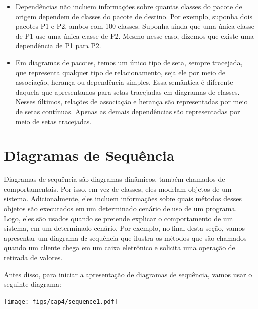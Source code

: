 \documentclass[
  11pt,
  twoside]{book}
\begin{document}
\begin{itemize}
\item
  Dependências não incluem informações sobre quantas classes do pacote
  de origem dependem de classes do pacote de destino. Por exemplo,
  suponha dois pacotes P1 e P2, ambos com 100 classes. Suponha ainda que
  uma única classe de P1 use uma única classe de P2. Mesmo nesse caso,
  dizemos que existe uma dependência de P1 para P2.
\item
  Em diagramas de pacotes, temos um único tipo de seta, sempre
  tracejada, que representa qualquer tipo de relacionamento, seja ele
  por meio de associação, herança ou dependência simples. Essa semântica
  é diferente daquela que apresentamos para setas tracejadas em
  diagramas de classes. Nesses últimos, relações de associação e herança
  são representadas por meio de setas contínuas. Apenas as demais
  dependências são representadas por meio de setas tracejadas.
\end{itemize}

\hypertarget{diagramas-de-sequuxeancia}{%
\section{Diagramas de Sequência}\label{diagramas-de-sequuxeancia}}

 

Diagramas de sequência são diagramas dinâmicos, também chamados de
comportamentais. Por isso, em vez de classes, eles modelam objetos de um
sistema. Adicionalmente, eles incluem informações sobre quais métodos
desses objetos são executados em um determinado cenário de uso de um
programa. Logo, eles são usados quando se pretende explicar o
comportamento de um sistema, em um determinado cenário. Por exemplo, no
final desta seção, vamos apresentar um diagrama de sequência que ilustra
os métodos que são chamados quando um cliente chega em um caixa
eletrônico e solicita uma operação de retirada de valores.

Antes disso, para iniciar a apresentação de diagramas de sequência,
vamos usar o seguinte diagrama:

\texttt{[image: figs/cap4/sequence1.pdf]}
\end{document}
